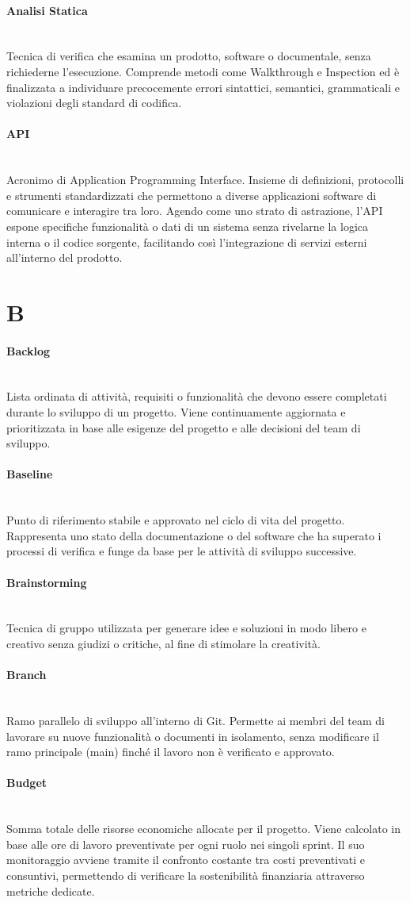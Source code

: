 \documentclass[a4paper, 10pt, colorlinks=true, linkcolor=black, urlcolor=blue, citecolor=blue, hidelinks]{article}
\newcommand{\glossaryterm}[2]{
    \paragraph{#1 \label{term:#1}} \mbox{} \\
    #2
    \vspace{0.5em}
}
\begin{document}
\glossaryterm{Analisi Statica}{Tecnica di verifica che esamina un prodotto, software o documentale, senza richiederne l'esecuzione. Comprende metodi come Walkthrough e Inspection ed è finalizzata a individuare precocemente errori sintattici, semantici, grammaticali e violazioni degli standard di codifica.}

\glossaryterm{API}{Acronimo di Application Programming Interface. Insieme di definizioni, protocolli e strumenti standardizzati che permettono a diverse applicazioni software di comunicare e interagire tra loro. Agendo come uno strato di astrazione, l'API espone specifiche funzionalità o dati di un sistema senza rivelarne la logica interna o il codice sorgente, facilitando così l'integrazione di servizi esterni all'interno del prodotto.}

\newpage

\section*{B}

\glossaryterm{Backlog}{Lista ordinata di attività, requisiti o funzionalità che devono essere completati durante lo sviluppo di un progetto. Viene continuamente aggiornata e prioritizzata in base alle esigenze del progetto e alle decisioni del team di sviluppo.}

\glossaryterm{Baseline}{Punto di riferimento stabile e approvato nel ciclo di vita del progetto. Rappresenta uno stato della documentazione o del software che ha superato i processi di verifica e funge da base per le attività di sviluppo successive.}

\glossaryterm{Brainstorming}{Tecnica di gruppo utilizzata per generare idee e soluzioni in modo libero e creativo senza giudizi o critiche, al fine di stimolare la creatività.}

\glossaryterm{Branch}{Ramo parallelo di sviluppo all'interno di Git. Permette ai membri del team di lavorare su nuove funzionalità o documenti in isolamento, senza modificare il ramo principale (main) finché il lavoro non è verificato e approvato.}

\glossaryterm{Budget}{Somma totale delle risorse economiche allocate per il progetto. Viene calcolato in base alle ore di lavoro preventivate per ogni ruolo nei singoli sprint. Il suo monitoraggio avviene tramite il confronto costante tra costi preventivati e consuntivi, permettendo di verificare la sostenibilità finanziaria attraverso metriche dedicate.}
\end{document}
